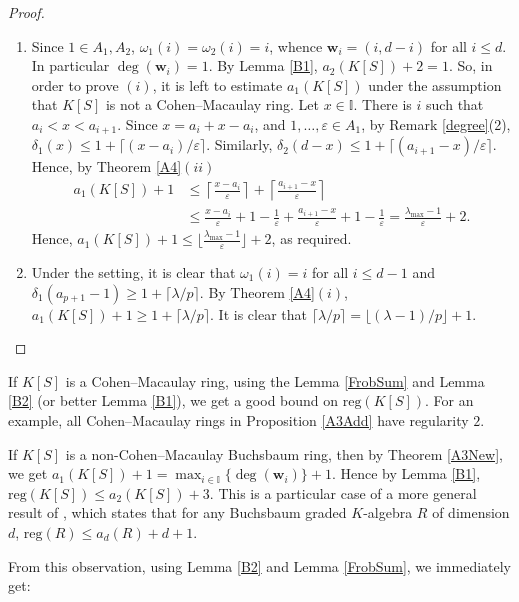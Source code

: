 \documentclass[11pt]{article}
\def\deg{\operatorname{deg}}
\def\reg{\mathrm{reg}}
\def\wbf{{\mathbf w}}
\def\Iset{{\mathbb I}}
\theoremstyle{remark}
\theoremstyle{definition}
\begin{document}
\begin{proof} 
\begin{enumerate}[\((i)\)]
    \item Since $1\in A_1, A_2$, $\omega_1(i) = \omega_2(i) = i$, whence $\wbf_i = (i, d-i)$ for all $i\le d$. In particular $\deg(\wbf_i) = 1$. By Lemma \ref{B1}, $a_2(K[S]) + 2 =1$. So, in order to prove \((i)\), it is left to estimate $a_1(K[S])$ under the assumption that $K[S]$ is not a Cohen--Macaulay ring. Let $x\in \Iset$. There is $i$ such that $a_i < x< a_{i+1}$. Since $x = a_i + x -a_i$, and $1,\ldots,\varepsilon \in A_1$, by Remark \ref{degree}(2), $\delta_1(x) \leq 1 + \lceil (x-a_i)/\varepsilon\rceil$. Similarly, $\delta_2(d-x)\leq 1 + \lceil (a_{i+1} - x)/\varepsilon\rceil$. Hence, by Theorem \ref{A4}\((ii)\)
\begin{align*}
    a_1(K[S]) + 1 &\leq  \left\lceil \frac{ x-a_i}{\varepsilon} \right\rceil + \left\lceil \frac {a_{i+1} - x} {\varepsilon} \right\rceil   \\
&\leq  \frac{ x-a_i}{\varepsilon} + 1 - \frac{1}{\varepsilon} +  \frac{a_{i+1} - x}{\varepsilon} + 1 - \frac{1}{\varepsilon} = \frac{\lambda_{\max} - 1}{\varepsilon} + 2.
\end{align*}
Hence, $a_1(K[S]) + 1\leq \lfloor \frac{\lambda_{\max} - 1}{\varepsilon} \rfloor + 2$, as required.
\item Under the setting, it is clear that $\omega_1(i) = i$ for all $i\leq d-1$ and $\delta_1(a_{p+1} -1) \geq 1+ \lceil \lambda/ p \rceil$. By Theorem \ref{A4}\((i)\), $a_1(K[S]) + 1 \geq 1+ \lceil \lambda/ p \rceil$. It is clear that  $\lceil \lambda/ p \rceil = \lfloor (\lambda -1)/ p \rfloor + 1$.
\end{enumerate}
\end{proof}

If $K[S]$ is a Cohen--Macaulay ring, using the Lemma \ref{FrobSum} and Lemma \ref{B2} (or better Lemma \ref{B1}), we get a good bound on $\reg(K[S])$.  For an example, all Cohen--Macaulay rings in Proposition \ref{A3Add} have regularity $2$.

 If $K[S]$ is a non-Cohen--Macaulay Buchsbaum ring, then by Theorem \ref{A3New}, we get $a_1(K[S])  + 1  = \max_{i\in \Iset}\{\deg(\wbf_i)\} + 1$. Hence by Lemma \ref{B1}, $\reg(K[S]) \leq a_2(K[S])  + 3.$ This is a particular case of a more general result of \cite[Corollary 2.8]{HM}, which states that for any Buchsbaum graded $K$-algebra $R$ of dimension $d$, $\reg(R) \leq  a_d(R) + d + 1$.

From this observation, using Lemma \ref{B2} and Lemma \ref{FrobSum}, we immediately get:
\end{document}
